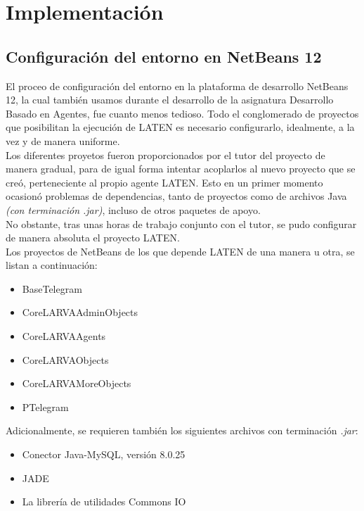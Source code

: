 \chapter{Implementación}

\section{Configuración del entorno en NetBeans 12}

El proceo de configuración del entorno en la plataforma de desarrollo NetBeans 12, la cual también usamos durante el desarrollo de la asignatura Desarrollo Basado en Agentes, fue cuanto menos tedioso. Todo el conglomerado de proyectos que posibilitan la ejecución de LATEN es necesario configurarlo, idealmente, a la vez y de manera uniforme.\\

Los diferentes proyetos fueron proporcionados por el tutor del proyecto de manera gradual, para de igual forma intentar acoplarlos al nuevo proyecto que se creó, perteneciente al propio agente LATEN. Esto en un primer momento ocasionó problemas de dependencias, tanto de proyectos como de archivos Java \textit{(con terminación .jar)}, incluso de otros paquetes de apoyo.\\

No obstante, tras unas horas de trabajo conjunto con el tutor, se pudo configurar de manera absoluta el proyecto LATEN.\\

Los proyectos de NetBeans de los que depende LATEN de una manera u otra, se listan a continuación:

\begin{itemize}
	\item BaseTelegram
	\item CoreLARVAAdminObjects
	\item CoreLARVAAgents
	\item CoreLARVAObjects
	\item CoreLARVAMoreObjects
	\item PTelegram
\end{itemize}

Adicionalmente, se requieren también los siguientes archivos con terminación \textit{.jar}:

\begin{itemize}
	\item Conector Java-MySQL, versión 8.0.25
	\item JADE
	\item La librería de utilidades Commons IO
\end{itemize}

